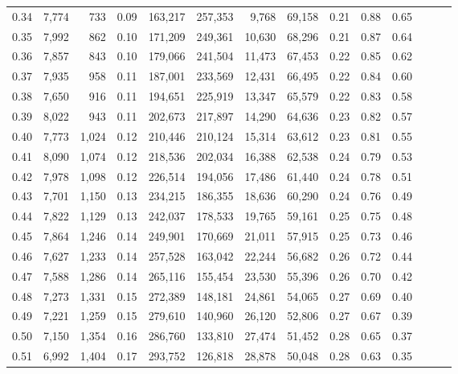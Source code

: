 \begin{tabular}{rrrrrrrrrrrrrr}
0.34 &   7,774 &    733 &  0.09 &  163,217 &  257,353 &   9,768 &  69,158 &  0.21 &  0.88 &      0.65 \\
0.35 &   7,992 &    862 &  0.10 &  171,209 &  249,361 &  10,630 &  68,296 &  0.21 &  0.87 &      0.64 \\
0.36 &   7,857 &    843 &  0.10 &  179,066 &  241,504 &  11,473 &  67,453 &  0.22 &  0.85 &      0.62 \\
0.37 &   7,935 &    958 &  0.11 &  187,001 &  233,569 &  12,431 &  66,495 &  0.22 &  0.84 &      0.60 \\
0.38 &   7,650 &    916 &  0.11 &  194,651 &  225,919 &  13,347 &  65,579 &  0.22 &  0.83 &      0.58 \\
0.39 &   8,022 &    943 &  0.11 &  202,673 &  217,897 &  14,290 &  64,636 &  0.23 &  0.82 &      0.57 \\
0.40 &   7,773 &  1,024 &  0.12 &  210,446 &  210,124 &  15,314 &  63,612 &  0.23 &  0.81 &      0.55 \\
0.41 &   8,090 &  1,074 &  0.12 &  218,536 &  202,034 &  16,388 &  62,538 &  0.24 &  0.79 &      0.53 \\
0.42 &   7,978 &  1,098 &  0.12 &  226,514 &  194,056 &  17,486 &  61,440 &  0.24 &  0.78 &      0.51 \\
0.43 &   7,701 &  1,150 &  0.13 &  234,215 &  186,355 &  18,636 &  60,290 &  0.24 &  0.76 &      0.49 \\
0.44 &   7,822 &  1,129 &  0.13 &  242,037 &  178,533 &  19,765 &  59,161 &  0.25 &  0.75 &      0.48 \\
0.45 &   7,864 &  1,246 &  0.14 &  249,901 &  170,669 &  21,011 &  57,915 &  0.25 &  0.73 &      0.46 \\
0.46 &   7,627 &  1,233 &  0.14 &  257,528 &  163,042 &  22,244 &  56,682 &  0.26 &  0.72 &      0.44 \\
0.47 &   7,588 &  1,286 &  0.14 &  265,116 &  155,454 &  23,530 &  55,396 &  0.26 &  0.70 &      0.42 \\
0.48 &   7,273 &  1,331 &  0.15 &  272,389 &  148,181 &  24,861 &  54,065 &  0.27 &  0.69 &      0.40 \\
0.49 &   7,221 &  1,259 &  0.15 &  279,610 &  140,960 &  26,120 &  52,806 &  0.27 &  0.67 &      0.39 \\
0.50 &   7,150 &  1,354 &  0.16 &  286,760 &  133,810 &  27,474 &  51,452 &  0.28 &  0.65 &      0.37 \\
0.51 &   6,992 &  1,404 &  0.17 &  293,752 &  126,818 &  28,878 &  50,048 &  0.28 &  0.63 &      0.35 \\

\end{tabular}
